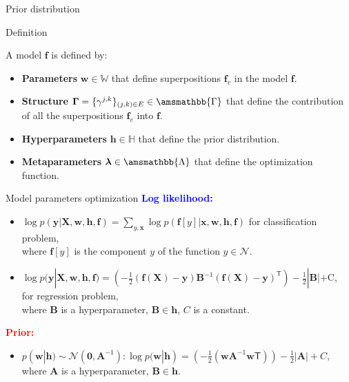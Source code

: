 \documentclass[usenames,dvipsnames,11pt,pdf,utf8,russian,aspectratio=169]{beamer}
\begin{document}
\begin{frame}{Prior distribution}
\begin{block}{Definition}
\end{block}
A model $\mathbf{f}$ is defined by:
\begin{itemize}
\item \textbf{Parameters} $\mathbf{w} \in \mathbb{W}$ that define superpositions  $\mathbf{f}_v$ in the model $\mathbf{f}$.
\item \textbf{Structure} $\boldsymbol{\Gamma}=\{\gamma^{j,k}\}_{(j,k)\in E} \in \amsmathbb{\Gamma}$ that define the contribution of all the superpositions  $\mathbf{f}_v$ into $\mathbf{f}$.
\item \textbf{Hyperparameters} $\mathbf{h} \in \mathbb{H}$ that define the prior distribution.
\item \textbf{Metaparameters} $\boldsymbol{\lambda} \in \amsmathbb{\Lambda}$ that define the optimization function.
\end{itemize}

\end{frame}

\begin{frame}{Model parameters optimization}
\textcolor{blue}{\textbf{Log likelihood:}}
\begin{itemize}
\item $\log p(\mathbf{y}|\mathbf{X}, \mathbf{w}, \mathbf{h}, \mathbf{f}) = \sum_{y, \mathbf{x}} \log p(\mathbf{f}[y]|\mathbf{x}, \mathbf{w}, \mathbf{h}, \mathbf{f})$ for classification problem, \\
where $\mathbf{f}[y]$ is the component   $y$  of the function $y \in \mathcal{N}$.

\item $\log p(\mathbf{y}|\mathbf{X}, \mathbf{w}, \mathbf{h}, \mathbf{f}) = \left(-\frac{1}{2}(\mathbf{f}(\mathbf{X})  -  \mathbf{\mathbf{y}})\mathbf{B}^{-1}(\mathbf{f}(\mathbf{X})  -  \mathbf{\mathbf{y}})^{\mathsf{T}}\right) - \frac{1}{2} |\mathbf{B}| + \text{C},$ for regression problem,\\
where $\mathbf{B}$ is a hyperparameter, $\mathbf{B} \in \mathbf{h}$, $C$ is a constant.
\end{itemize}
\textcolor{red}{\textbf{Prior:}}\\
\begin{itemize}
\item $p(\mathbf{w}|\mathbf{h}) \sim \mathcal{N}(\mathbf{0}, \mathbf{A}^{-1}): \log p(\mathbf{w}|\mathbf{h})  = \left(-\frac{1}{2}(\mathbf{w}\mathbf{A}^{-1}\mathbf{w}{\mathsf{T}})\right) - \frac{1}{2} |\mathbf{A}| + C,$ \\ where $\mathbf{A}$ is a hyperparameter, $\mathbf{B} \in \mathbf{h}$.
\end{itemize}
\end{frame}
\end{document}
